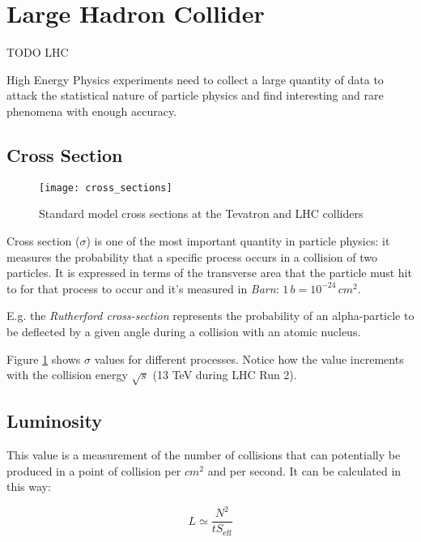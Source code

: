\section{Large Hadron Collider}


TODO LHC

High Energy Physics experiments need to collect a large quantity of data to attack the statistical nature of particle physics and find interesting and rare phenomena with enough accuracy.

\subsection{Cross Section}

\begin{figure}

	\centerline{
		\texttt{[image: cross\_sections]}}
	\caption{Standard  model  cross  sections  at  the  Tevatron  and  LHC  colliders\cite{Bechtel:2009zza}}
	\label{fig:cross_sections}
\end{figure}

Cross section ($\sigma$) is one of the most important quantity in particle physics: it measures the probability that a specific process occurs in a collision of two particles. It is expressed in terms of the transverse area that the particle must hit to for that process to occur and it's measured in \textit{Barn}: $1\, b = 10^{-24} \,cm^2$.

E.g. the \textit{Rutherford cross-section} represents the probability of an alpha-particle to be deflected by a given angle during a collision with an atomic nucleus.


Figure \ref{fig:cross_sections} shows $\sigma$ values for different processes. Notice how the value increments with the collision energy $\sqrt s$ (13 TeV during LHC Run 2).

\subsection{Luminosity}

This value is a measurement of the number of collisions that can potentially be produced in a point of collision per $cm^2$ and per second. It can be calculated in this way:

\begin{equation}
	L \simeq  \frac{N^2}{t S_{\text{eff}}}
\end{equation}

